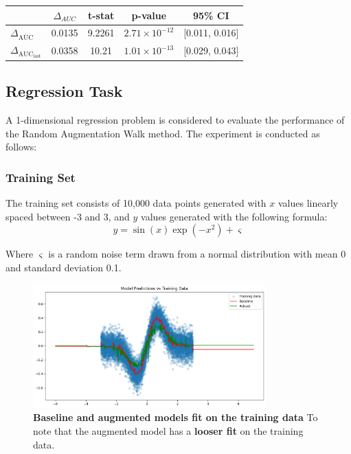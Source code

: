 \begin{table}[H]
    \centering
    \small
    \begin{tabular}{lcccc}
        \toprule
        & $\Delta_{AUC}$ & t-stat & p-value & 95\% CI \\
        \midrule
        $\Delta_{\overline{\text{AUC}}}$ & 0.0135 & 9.2261  & $2.71 \times 10^{-12}$ & [0.011, 0.016] \\
        $\Delta_{\text{AUC}_{\text{last}}}$ & 0.0358 & 10.21 & $1.01 \times 10^{-13}$ & [0.029, 0.043] \\
        \bottomrule
    \end{tabular}
\end{table}




\subsection{Regression Task}

A 1-dimensional regression problem is considered to evaluate the performance of the Random Augmentation Walk method. The experiment is conducted as follows:

\subsubsection{Training Set}
The training set consists of 10,000 data points generated with $x$ values linearly spaced between -3 and 3, and $y$ values generated with the following formula:
\begin{equation}
    y = \sin(x)\exp(-x^2) + \varsigma
\end{equation}

Where $\varsigma$ is a random noise term drawn from a normal distribution with mean 0 and standard deviation 0.1.

\begin{figure}[H]
    \centering
    \includegraphics[width=0.8\textwidth]{assets/fit_on_train.png} 
    \caption{\textbf{Baseline and augmented models fit on the training data} To note that the augmented model has a \textbf{looser fit} on the training data.}
    \label{fig:fit-train}
\end{figure}

